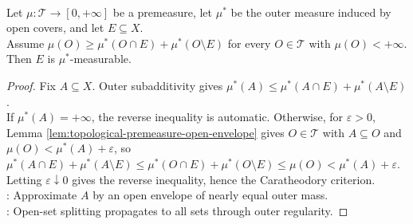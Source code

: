 \begin{lemma} \label{lem:topological-premeasure-open-measurability-test} \\
Let $\mu:\mathcal{T}\to[0,+\infty]$ be a premeasure, let $\mu^\ast$ be the outer measure induced by open covers, and let $E\subseteq X$.\\
Assume $\mu(O)\geq\mu^\ast(O\cap E)+\mu^\ast(O\setminus E)$ for every $O\in\mathcal{T}$ with $\mu(O)<+\infty$. Then $E$ is $\mu^\ast$-measurable.
\begin{proof} Fix $A\subseteq X$. Outer subadditivity gives $\mu^\ast(A)\leq\mu^\ast(A\cap E)+\mu^\ast(A\setminus E)$.\\
If $\mu^\ast(A)=+\infty$, the reverse inequality is automatic. Otherwise, for $\varepsilon>0$, Lemma \ref{lem:topological-premeasure-open-envelope} gives $O\in\mathcal{T}$ with $A\subseteq O$ and $\mu(O)<\mu^\ast(A)+\varepsilon$, so $\mu^\ast(A\cap E)+\mu^\ast(A\setminus E)\leq\mu^\ast(O\cap E)+\mu^\ast(O\setminus E)\leq\mu(O)<\mu^\ast(A)+\varepsilon$.\\
Letting $\varepsilon\downarrow0$ gives the reverse inequality, hence the Caratheodory criterion.\\
: Approximate $A$ by an open envelope of nearly equal outer mass.\\
: Open-set splitting propagates to all sets through outer regularity.
\end{proof}
\end{lemma}

